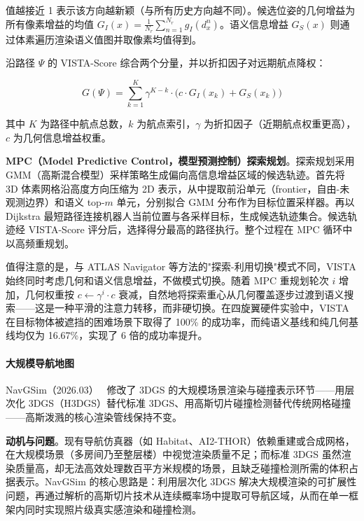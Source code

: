 值越接近 1 表示该方向越新颖（与所有历史方向越不同）。候选位姿的几何增益为所有像素增益的均值 $G_I(x) = \frac{1}{N_r}\sum_{n=1}^{N_r} g_I(d_x^n)$。语义信息增益 $G_S(x)$ 则通过体素遍历渲染语义值图并取像素均值得到。

沿路径 $\Psi$ 的 VISTA-Score 综合两个分量，并以折扣因子对远期航点降权：

\begin{equation}
G(\Psi) = \sum_{k=1}^{K} \gamma^{K-k} \cdot \bigl(c \cdot G_I(x_k) + G_S(x_k)\bigr)
\end{equation}

其中 $K$ 为路径中航点总数，$k$ 为航点索引，$\gamma$ 为折扣因子（近期航点权重更高），$c$ 为几何信息增益权重。

\textbf{MPC（Model Predictive Control，模型预测控制）探索规划}。探索规划采用 GMM（高斯混合模型）采样策略生成偏向高信息增益区域的候选轨迹。首先将 3D 体素网格沿高度方向压缩为 2D 表示，从中提取前沿单元（frontier，自由-未观测边界）和语义 top-$m$ 单元，分别拟合 GMM 分布作为目标位置采样器。再以 Dijkstra 最短路径连接机器人当前位置与各采样目标，生成候选轨迹集合。候选轨迹经 VISTA-Score 评分后，选择得分最高的路径执行。整个过程在 MPC 循环中以高频重规划。

值得注意的是，与 ATLAS Navigator 等方法的"探索-利用切换"模式不同，VISTA 始终同时考虑几何和语义信息增益，不做模式切换。随着 MPC 重规划轮次 $i$ 增加，几何权重按 $c \leftarrow \gamma^i \cdot c$ 衰减，自然地将探索重心从几何覆盖逐步过渡到语义搜索——这是一种平滑的注意力转移，而非硬切换。在四旋翼硬件实验中，VISTA 在目标物体被遮挡的困难场景下取得了 100\% 的成功率，而纯语义基线和纯几何基线均仅为 16.67\%，实现了 6 倍的成功率提升。

\paragraph{大规模导航地图}

NavGSim（2026.03）~\cite{2603_15186} 修改了 3DGS 的大规模场景渲染与碰撞表示环节——用层次化 3DGS（H3DGS）替代标准 3DGS、用高斯切片碰撞检测替代传统网格碰撞——高斯泼溅的核心渲染管线保持不变。

\textbf{动机与问题}。现有导航仿真器（如 Habitat、AI2-THOR）依赖重建或合成网格，在大规模场景（多房间乃至整层楼）中视觉渲染质量不足；而标准 3DGS 虽然渲染质量高，却无法高效处理数百平方米规模的场景，且缺乏碰撞检测所需的体积占据表示。NavGSim 的核心思路是：利用层次化 3DGS 解决大规模渲染的可扩展性问题，再通过解析的高斯切片技术从连续概率场中提取可导航区域，从而在单一框架内同时实现照片级真实感渲染和碰撞检测。

